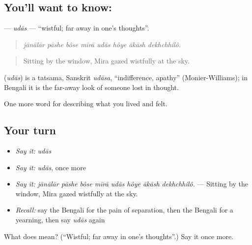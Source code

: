 \subsection*{You'll want to know: }
\textbf{} — \emph{udās} — \textquotedblleft{}wistful; far away in one's thoughts\textquotedblright{}.

\begin{quote}
       
\end{quote}

\begin{quote}
\emph{jānālār pāshe bôse mīrā udās hôye ākāsh dekhchhilô.}
\end{quote}

\begin{quote}
Sitting by the window, Mira gazed wistfully at the sky.
\end{quote}

\begin{cousinweb}
\textbf{} (\emph{udās}) is a tatsama, Sanskrit \emph{udāsa}, \textquotedblleft{}indifference, apathy\textquotedblright{} (Monier-Williams); in Bengali it is the far-away look of someone lost in thought.
\end{cousinweb}

\begin{grammarlens}[title={What you've built}]
One more word for describing what you lived and felt.
\end{grammarlens}

\subsection*{Your turn}
\begin{itemize}
\raggedright
  \item \emph{Say it:} \emph{udās}
  \item \emph{Say it:} \emph{udās}, once more
  \item \emph{Say it:} \emph{jānālār pāshe bôse mīrā udās hôye ākāsh dekhchhilô.} — Sitting by the window, Mira gazed wistfully at the sky.
  \item \emph{Recall:} say the Bengali for the pain of separation, then the Bengali for a yearning, then say \emph{udās} again
\end{itemize}

\begin{tcolorbox}[breakable,colback=teal!4,colframe=teal!35!black,title={Before you move on}]
What does  mean? (\textquotedblleft{}Wistful; far away in one's thoughts\textquotedblright{}.) Say it once more.
\end{tcolorbox}
